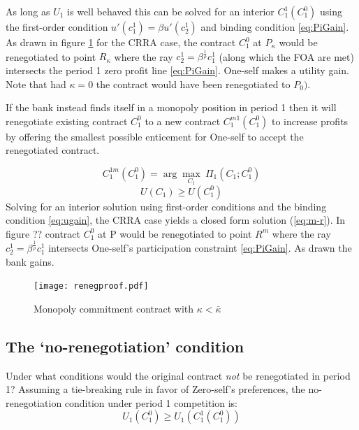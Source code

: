 \documentclass[11pt,english]{article}
\theoremstyle{plain}
\theoremstyle{definition}
\begin{document}
As long as $U_{1}$ is well behaved this can be solved for
an interior $C_{1}^{1}(C_{1}^{0})$ using the first-order condition
$u'(c_{1}^{1})=\beta u'(c_{2}^{1})$ and binding condition \ref{eq:PiGain}.
As drawn in figure \ref{fig:renegproof} for the CRRA case, the contract $C_{1}^{0}$
at $P_{\kappa}$ would be renegotiated to point $R_{\kappa}$ where the ray 
$c_{2}^{1}=\beta^{\frac{1}{\rho}}c_{1}^{1}$
(along which the FOA are met) intersects the period 1 zero profit
line \ref{eq:PiGain}. One-self makes a utility gain. Note that had
$\kappa=0$ the contract would have been renegotiated to $P_{0}).$

If the bank instead finds itself in a monopoly position in period
1 then it will renegotiate existing contract $C_{1}^{0}$ to a new
contract $C_{1}^{m1}(C_{1}^{0})$ to increase profits by offering
the smallest possible enticement for One-self to accept the renegotiated
contract.

\begin{equation}
C_{1}^{1m}(C_{1}^{0})=\arg\max_{C_{1}}\ \Pi_{1}(C_{1};C_{1}^{0})
\end{equation}
\begin{equation}
U(C_{1})\geq U(C_{1}^{0})\label{eq:ugain}
\end{equation}
Solving for an interior solution using first-order conditions and
the binding condition \ref{eq:ugain}, the CRRA case yields a closed
form solution (\ref{eq:m-r}). In figure ?? contract $C_{1}^{0}$
at P would be renegotiated to point $R^{m}$ where the ray $c_{2}^{1}=\beta^{\frac{1}{\rho}}c_{1}^{1}$
intersects One-self's participation constraint \ref{eq:PiGain}. As
drawn the bank gains.

\begin{figure}
  \texttt{[image: renegproof.pdf]}
  \caption{Monopoly commitment contract with $\kappa<\bar{\kappa}$}
  \label{fig:renegproof} 
\end{figure}


\subsection{The `no-renegotiation' condition}

\label{sec-no-reneg-cond}

Under what conditions would the original contract \textit{not} be
renegotiated in period 1? Assuming a tie-breaking rule in favor of
Zero-self's preferences, the no-renegotiation condition under period
1 competition is: 
\begin{equation}
U_{1}\left(C_{1}^{0}\right)\geq U_{1}\left(C_{1}^{1}(C_{1}^{0})\right)\label{eq:no-reg-comp}
\end{equation}
\end{document}

